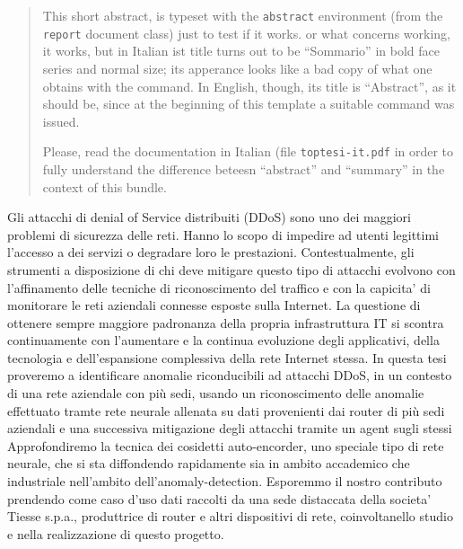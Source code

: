 \english
\begin{abstract}
This short abstract, is typeset with the \texttt{abstract} environment (from the \texttt{report} document class) just to test if it works. or what concerns working, it works, but in Italian ist title turns out to be ``Sommario'' in bold face series and normal size; its apperance looks like  a bad copy of what one obtains with the \texttt{\string\summary} command. In English, though, its title is “Abstract”, as it should be, since at the beginning of this template a suitable \texttt{\string\ExtendCapions} command was issued.

Please, read the documentation  in Italian (file \texttt{toptesi-it.pdf} in order to fully understand the difference beteesn “abstract” and “summary” in the context of this bundle.

\end{abstract}

\italiano
\sommario

Gli attacchi di denial of Service distribuiti (DDoS) sono uno dei maggiori problemi di sicurezza delle reti. Hanno lo scopo di impedire ad utenti legittimi l'accesso a dei servizi o degradare loro le prestazioni. Contestualmente, gli strumenti a disposizione di chi deve mitigare questo tipo di attacchi evolvono con l'affinamento delle tecniche di riconoscimento del traffico e con la capicita' di monitorare le reti aziendali connesse esposte sulla Internet. La questione di ottenere sempre maggiore padronanza della propria infrastruttura IT si scontra continuamente con l'aumentare e la continua evoluzione degli applicativi, della tecnologia e dell'espansione complessiva della rete Internet stessa. In questa tesi proveremo a identificare anomalie riconducibili ad attacchi DDoS, in un contesto di una rete aziendale con più sedi, usando un riconoscimento delle anomalie effettuato tramte rete neurale allenata su dati provenienti dai router di più sedi aziendali e una successiva mitigazione degli attacchi tramite un agent sugli stessi Approfondiremo la tecnica dei cosidetti auto-encorder, uno speciale tipo di rete neurale, che si sta diffondendo rapidamente sia in ambito accademico che industriale nell'ambito dell'anomaly-detection. Esporemmo il nostro contributo prendendo come caso d'uso dati raccolti da una sede distaccata della societa' Tiesse s.p.a., produttrice di router e altri dispositivi di rete, coinvoltanello studio e nella realizzazione di questo progetto.
